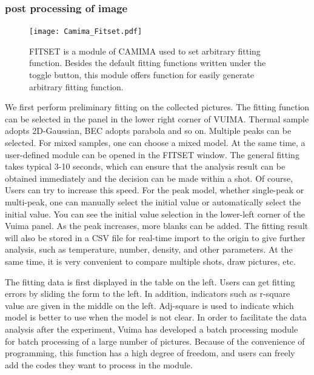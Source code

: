 \subsubsection{post processing of image}

\begin{figure}[htbp]
\begin{center}
\texttt{[image: Camima\_Fitset.pdf]}
\end{center}
\caption[FITSET: a module of CAMIMA used to set arbitrary fitting function]{FITSET is a module of CAMIMA used to set arbitrary fitting function. Besides the default fitting functions written under the toggle button, this module offers function for easily generate arbitrary fitting function.}
\label{Camima_Fitset}
\end{figure}

We first perform preliminary fitting on the collected pictures. The fitting function can be selected in the panel in the lower right corner of VUIMA. Thermal sample adopts 2D-Gaussian, BEC adopts parabola and so on. Multiple peaks can be selected. For mixed samples, one can choose a mixed model. At the same time, a user-defined module can be opened in the FITSET window. The general fitting takes typical 3-10 seconds, which can ensure that the analysis result can be obtained immediately and the decision can be made within a shot. Of course, Users can try to increase this speed. For the peak model, whether single-peak or multi-peak, one can manually select the initial value or automatically select the initial value. You can see the initial value selection in the lower-left corner of the Vuima panel. As the peak increases, more blanks can be added. The fitting result will also be stored in a CSV file for real-time import to the origin to give further analysis, such as temperature, number, density, and other parameters. At the same time, it is very convenient to compare multiple shots, draw pictures, etc.

The fitting data is first displayed in the table on the left. Users can get fitting errors by sliding the form to the left. In addition, indicators such as r-square value are given in the middle on the left. Adj-square is used to indicate which model is better to use when the model is not clear. In order to facilitate the data analysis after the experiment, Vuima has developed a batch processing module for batch processing of a large number of pictures. Because of the convenience of programming, this function has a high degree of freedom, and users can freely add the codes they want to process in the module.


